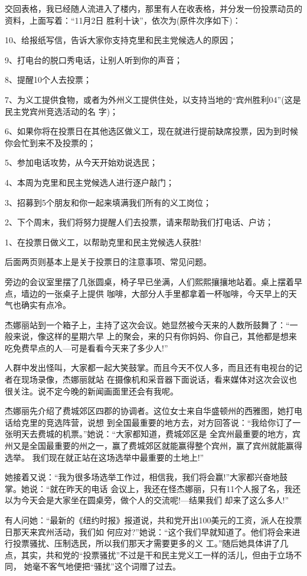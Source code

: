 ﻿\documentclass[11pt]{article}
\begin{document}
交回表格，我已经随人流进入了楼内，那里有人在收表格，并分发一份投票动员的资料，上面写着：``11月2日
胜利十诀''，依次为(原件次序如下)：

10、给报纸写信，告诉大家你支持克里和民主党候选人的原因；

9、打电台的脱口秀电话，让别人听到你的声音；

8、提醒10个人去投票；

7、为义工提供食物，或者为外州义工提供住处，以支持当地的``宾州胜利04''(这是民主党宾州竞选活动的名
字)；

6、如果你将在投票日在其他选区做义工，现在就进行提前缺席投票，因为到时候你会忙到来不及投票的；

5、参加电话攻势，从今天开始劝说选民；

4、本周为克里和民主党候选人进行逐户敲门；

3、招募到5个朋友和你一起来填满我们所有的义工岗位；

2、下个周末，我们将努力提醒人们去投票，请来帮助我们打电话、户访；

1、在投票日做义工，以帮助克里和民主党候选人获胜!

后面两页则基本上是关于投票日的注意事项、常见问题。

旁边的会议室里摆了几张圆桌，椅子早已坐满，人们熙熙攘攘地站着。桌上摆着早点，墙边的一张桌子上提供
咖啡，大部分人手里都拿着一杯咖啡，今天早上的天气也确实有点冷。

杰娜丽站到一个箱子上，主持了这次会议。她显然被今天来的人数所鼓舞了：``一般来说，像这样的星期六早
上的聚会，来的只有你妈妈、你自己，其他都是想来吃免费早点的人---可是看看今天来了多少人!''

人群中发出怪叫，大家都一起大笑鼓掌。而且今天不仅人多，而且还有电视台的记者在现场录像，杰娜丽就站
在摄像机和采音器下面说话，看来媒体对这次会议也很关注。说不定今晚的新闻画面里还会有我呢。

杰娜丽先介绍了费城郊区四郡的协调者。这位女士来自华盛顿州的西雅图，她打电话给克里的竞选阵营，说想
到全国最重要的地方去，对方回答说：``我给你订了一张明天去费城的机票。''她说：``大家都知道，费城郊区是
全宾州最重要的地方，宾州又是全国最重要的州之一，赢了费城郊区就能赢得整个宾州，赢了宾州就能赢得选举。
我们现在就正站在这场选举中最重要的土地上!''

她接着又说：``我为很多场选举工作过，相信我，我们将会赢!''大家都兴奋地鼓掌。她说：``就在昨天的电话
会议上，我还在怪杰娜丽，只有11个人报了名，我还以为今天会是大家坐在圆桌旁，做个人的交流呢!---结果我们
却来了这么多人!''

有人问她：``最新的《纽约时报》报道说，共和党开出100美元的工资，派人在投票日那天来宾州活动，我们如
何应对?''她说：``这个我们早就知道了。他们将会来进行投票骚扰、压制选民，所以我们那天才需要更多的义
工。''随后她具体讲了几点，其实，共和党的``投票骚扰''不过是干和民主党义工一样的活儿，但由于立场不同，
她毫不客气地便把``骚扰''这个词赠了过去。
\end{document}
